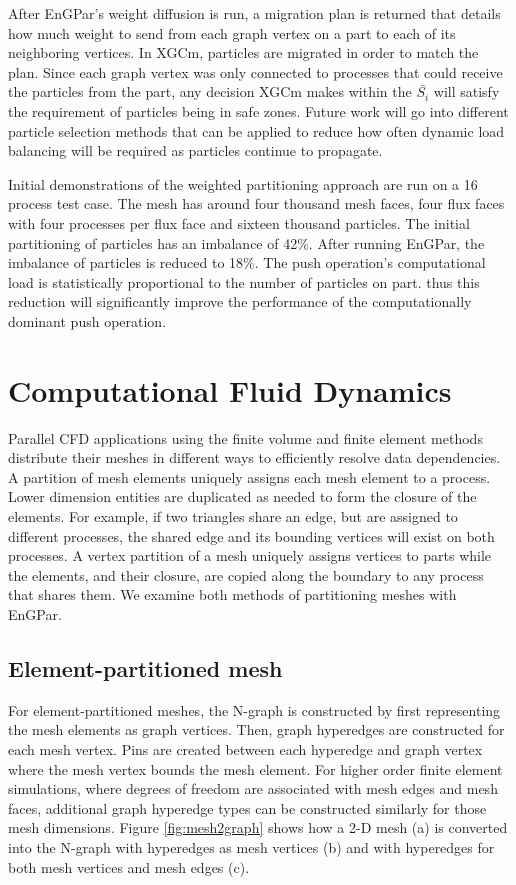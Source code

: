 \documentclass[conference]{IEEEtran}
\begin{document}
After EnGPar's weight diffusion is run, a migration plan is returned that details how
much weight to send from each graph vertex on a part to each of its neighboring vertices.
In XGCm, particles are migrated in order to match the plan. Since each graph vertex was only
connected to processes that could receive the particles from the part, any decision XGCm makes
within the $\bar{S_i}$ will satisfy the requirement of particles being in safe zones. Future work
will go into different particle selection methods that can be applied to reduce how often
dynamic load balancing will be required as particles continue to propagate.

Initial demonstrations of the weighted partitioning approach are run on a 16
process test case. The mesh has around four thousand
mesh faces, four flux faces with four processes per flux face and sixteen thousand particles.
The initial partitioning of particles has an imbalance of 42\%. After running EnGPar, the
imbalance of particles is reduced to 18\%. The push operation's computational load is
statistically proportional to the number of particles on part. thus this
reduction will significantly improve the performance of the computationally
dominant push operation.

\section{Computational Fluid Dynamics} \label{sec:cfd}

Parallel CFD applications using the
finite volume and finite element methods distribute their meshes in different
ways to efficiently resolve data dependencies.
A partition of mesh elements uniquely assigns each mesh element to a process.
Lower dimension entities are duplicated as needed to form the closure of the
elements.
For example, if two triangles share an edge, but are assigned to different
processes, the shared edge and its bounding vertices will exist on both
processes.
A vertex partition of a mesh uniquely assigns vertices to parts while the
elements, and their closure, are copied along the boundary to any process that
shares them.
We examine both methods of partitioning meshes with EnGPar.

\subsection{Element-partitioned mesh}\label{sec:elmPtn}

For element-partitioned meshes, the N-graph is constructed by first representing the mesh elements
as graph vertices. Then, graph hyperedges are constructed for each mesh vertex. Pins
are created between each hyperedge and graph vertex where the mesh vertex bounds the
mesh element. For higher order finite element simulations, where degrees of freedom are
associated with mesh edges and mesh faces, additional graph hyperedge types can be constructed
similarly for those mesh dimensions. Figure \ref{fig:mesh2graph} shows how a 2-D mesh (a)
is converted into the N-graph with hyperedges as mesh vertices (b) and with hyperedges for
both mesh vertices and mesh edges (c).
\end{document}
